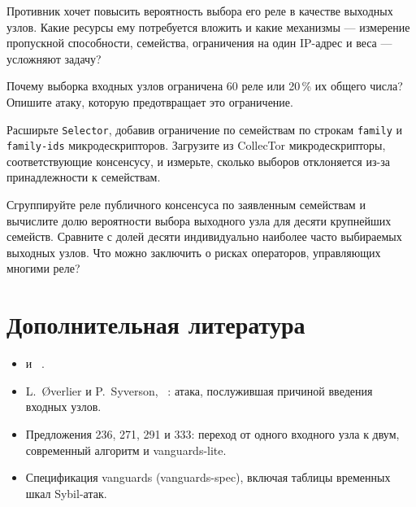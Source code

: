 \begin{esercizio}[2]\label{es:13-sybil}
Противник хочет повысить вероятность выбора его реле в качестве выходных узлов. Какие ресурсы ему потребуется вложить и какие механизмы --- измерение пропускной способности, семейства, ограничения на один IP-адрес и веса --- усложняют задачу?
\end{esercizio}

\begin{esercizio}[2]\label{es:13-campione}
Почему выборка входных узлов ограничена 60 реле или 20\,\% их общего числа? Опишите атаку, которую предотвращает это ограничение.
\end{esercizio}

\begin{esercizio}[3]\label{es:13-famiglie}
Расширьте \texttt{Selector}, добавив ограничение по семействам по строкам \texttt{family} и \texttt{family-ids} микродескрипторов. Загрузите из CollecTor микродескрипторы, соответствующие консенсусу, и измерьте, сколько выборов отклоняется из-за принадлежности к семействам.
\end{esercizio}

\begin{esercizio}[3]\label{es:13-operatori}
Сгруппируйте реле публичного консенсуса по заявленным семействам и вычислите долю вероятности выбора выходного узла для десяти крупнейших семейств. Сравните с долей десяти индивидуально наиболее часто выбираемых выходных узлов. Что можно заключить о рисках операторов, управляющих многими реле?
\end{esercizio}

\section*{Дополнительная литература}
\begin{itemize}
  \item {} и ~\cite{torspec}.
  \item L.~Øverlier и P.~Syverson, ~\cite{overlier2006locating}: атака, послужившая причиной введения входных узлов.
  \item Предложения 236, 271, 291 и 333: переход от одного входного узла к двум, современный алгоритм и vanguards-lite.
  \item Спецификация vanguards (vanguards-spec), включая таблицы временных шкал Sybil-атак.
\end{itemize}
